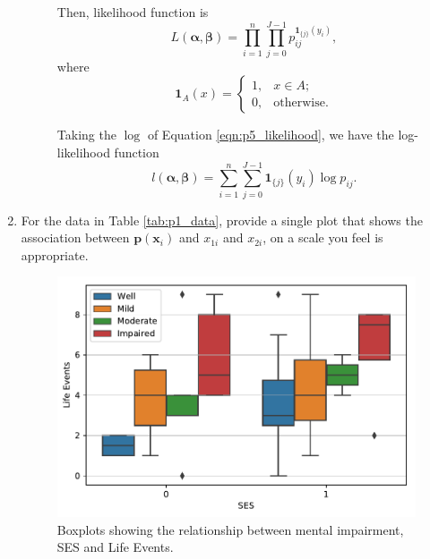 \documentclass[letterpaper,11pt]{article}
\begin{document}
\begin{enumerate}
\begin{description}
    Then, likelihood function is
    \begin{equation}
      L\left(\bm\alpha, \bm\beta\right)
      = \prod_{i=1}^n \prod_{j=0}^{J-1} p_{ij}^{\mathbf{1}_{\{j\}}\left(y_i\right)},
      \label{eqn:p5_likelihood}
    \end{equation}
    where
    \begin{equation}
      \mathbf{1}_A\left(x\right) = \begin{cases}
        1,&x \in A; \\
        0,&\text{otherwise}.
      \end{cases}
      \label{eqn:p5_indicator}
    \end{equation}

    Taking the $\log$ of Equation \ref{eqn:p5_likelihood}, we have the
    log-likelihood function
    \begin{equation}
      l\left(\bm\alpha,\bm\beta\right)
      = \sum_{i=1}^n\sum_{j=0}^{J-1}\mathbf{1}_{\{j\}}\left(y_i\right) \log p_{ij}.
    \end{equation}    
  \end{description}  
\item For the data in Table \ref{tab:p1_data}, provide a single plot that shows
  the association between $\mathbf{p}\left(\mathbf{x}_i\right)$ and $x_{1i}$ and
  $x_{2i}$, on a scale you feel is appropriate.
  \label{part:p6}

  \begin{figure}
    \centering
    \includegraphics{p6_descriptive.pdf}
    \caption{Boxplots showing the relationship between mental impairment, SES
      and Life Events.}
    \label{fig:p6_descriptive}
  \end{figure}
  

\end{enumerate}
\end{document}
